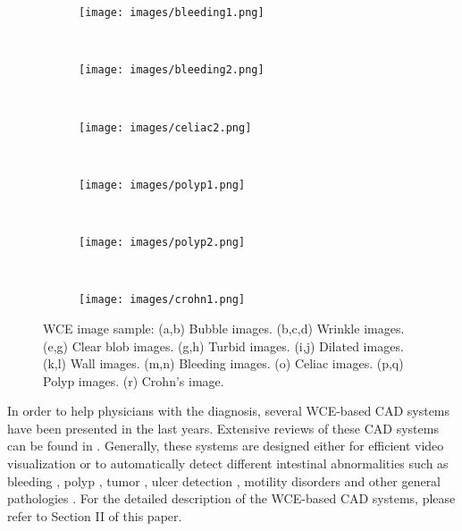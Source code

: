 \documentclass[review,12pt,3p]{elsarticle}
\begin{document}
\begin{figure}
        \begin{subfigure}[b]{0.08\textwidth}
                \texttt{[image: images/bleeding1.png]}
                \caption{}
        \end{subfigure}%
        ~ 
        \begin{subfigure}[b]{0.08\textwidth}
                \texttt{[image: images/bleeding2.png]}
                \caption{}
        \end{subfigure}
        ~
        \begin{subfigure}[b]{0.08\textwidth}
                \texttt{[image: images/celiac2.png]}
                \caption{}
        \end{subfigure}
        ~
        \begin{subfigure}[b]{0.08\textwidth}
                \texttt{[image: images/polyp1.png]}
                \caption{}
        \end{subfigure}
        ~
        \begin{subfigure}[b]{0.08\textwidth}
                \texttt{[image: images/polyp2.png]}
                \caption{}
                \label{fig:mouse}
        \end{subfigure}
        ~
        \begin{subfigure}[b]{0.08\textwidth}
                \texttt{[image: images/crohn1.png]}
                \caption{}
        \end{subfigure}
        
        \caption{WCE image sample: (a,b) Bubble images. (b,c,d)  Wrinkle images. (e,g) Clear blob images. (g,h) Turbid images. (i,j) Dilated images. (k,l) Wall images. (m,n) Bleeding images. (o) Celiac images. (p,q) Polyp images. (r) Crohn's image.}\label{fig:WCEsamples}
\end{figure}

In order to  help physicians with the diagnosis, several  WCE-based CAD systems have been presented in the last years. Extensive reviews of these CAD systems can be found  in \cite{liedlgruber2011computer,belle2013biomedical, iakovidis2015software}. Generally, these systems are designed either for efficient video visualization  \cite{mackiewicz2008wireless,chu2010epitomized,iakovidis2013efficient,drozdzal2013adaptable} or to automatically detect different intestinal abnormalities such as bleeding \cite{chen2009,6497444}, polyp \cite{polypsMamonov,yuanpolyp}, tumor \cite{tumor2006}, ulcer detection \cite{ciaccio2013implementation}, motility disorders \cite{Malagelada2015,sseguiWrinkles} and other general pathologies \cite{ciaccio2010distinguishing,6051474,malagelada2012functional,Chen2013}.  For the detailed description of the WCE-based CAD systems, please refer to Section II of this paper.
\end{document}

